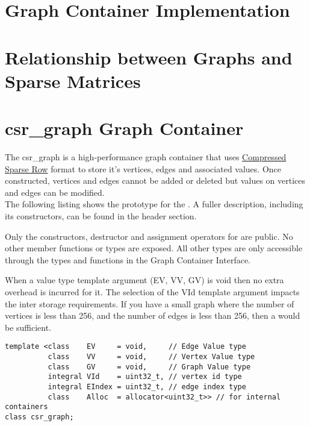 \section{Graph Container Implementation}


\section{Relationship between Graphs and Sparse Matrices}


\section{csr\_graph Graph Container}
The csr\_graph is a high-performance graph container that uses \href{https://en.wikipedia.org/wiki/Sparse_matrix#Compressed_sparse_row_\%28CSR\%2C_CRS_or_Yale_format\%29}{Compressed Sparse Row} format to store it's vertices, edges and associated values. Once constructed, vertices and edges cannot be added or deleted but values on vertices and edges can be modified.
\\

The following listing shows the prototype for the . A fuller description, including its constructors, can be found in the  header section.

Only the constructors, destructor and assignment operators for  are public. No other member functions or types are exposed. All other types are only accessible through the types and functions in the Graph Container Interface.

When a value type template argument (EV, VV, GV) is void then no extra overhead is incurred for it. The selection of the VId template argument impacts the inter storage requirements. If you have a small graph where the number of vertices is less than 256, and the number of edges is less than 256, then a  would be sufficient.

\begin{lstlisting}
template <class    EV     = void,     // Edge Value type
          class    VV     = void,     // Vertex Value type
          class    GV     = void,     // Graph Value type
          integral VId    = uint32_t, // vertex id type
          integral EIndex = uint32_t, // edge index type
          class    Alloc  = allocator<uint32_t>> // for internal containers
class csr_graph;
\end{lstlisting}

